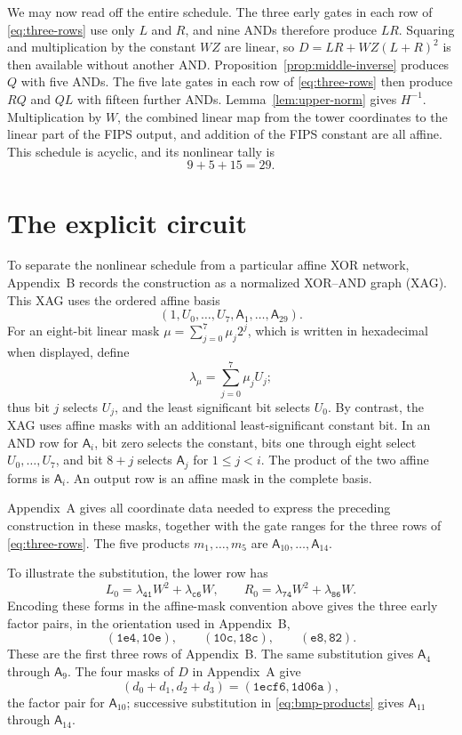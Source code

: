 \documentclass[11pt]{article}
\newcommand{\gate}[1]{\mathsf A_{#1}}
\begin{document}
We may now read off the entire schedule.  The three early gates in each row of
\eqref{eq:three-rows} use only \(L\) and \(R\), and nine ANDs therefore
produce \(LR\).  Squaring and multiplication by the constant \(WZ\) are
linear, so \(D=LR+WZ(L+R)^2\) is then available without another AND.
Proposition~\ref{prop:middle-inverse} produces \(Q\) with five ANDs.  The
five late gates in each row of \eqref{eq:three-rows} then produce \(RQ\)
and \(QL\) with fifteen further ANDs.  Lemma~\ref{lem:upper-norm} gives
\(H^{-1}\).  Multiplication by \(W\), the combined linear map from the tower
coordinates to the linear part of the FIPS output, and addition of the FIPS
constant are all affine.  This schedule is acyclic, and its nonlinear tally is
\[
 9+5+15=29.
\]

\section{The explicit circuit}\label{sec:identification}

To separate the nonlinear schedule from a particular affine XOR network,
Appendix~B records the construction as a normalized XOR--AND graph (XAG).
This XAG uses the
ordered affine basis
\[
 (1,U_0,\ldots,U_7,\gate{1},\ldots,\gate{29}).
\]
For an eight-bit linear mask \(\mu=\sum_{j=0}^7\mu_j2^j\), which is
written in hexadecimal when displayed, define
\[
 \lambda_\mu=\sum_{j=0}^7\mu_jU_j;
\]
thus bit \(j\) selects \(U_j\), and the least significant bit selects
\(U_0\).  By contrast, the XAG uses affine masks with an additional
least-significant constant bit.  In an AND row for \(\gate{i}\), bit zero
selects the constant, bits one through eight select \(U_0,\ldots,U_7\),
and bit \(8+j\) selects \(\gate{j}\) for \(1\leq j<i\).  The product of
the two affine forms is \(\gate{i}\).  An output row is an affine mask in
the complete basis.

Appendix~A gives all coordinate data needed to express the preceding
construction in these masks, together with the gate ranges for the three
rows of \eqref{eq:three-rows}.  The five products
\(m_1,\ldots,m_5\) are \(\gate{10},\ldots,\gate{14}\).

To illustrate the substitution, the lower row has
\[
 L_0=\lambda_{\mathtt{41}}W^2+\lambda_{\mathtt{c6}}W,\qquad
 R_0=\lambda_{\mathtt{74}}W^2+\lambda_{\mathtt{86}}W.
\]
Encoding these forms in the affine-mask convention above gives the three
early factor pairs, in the orientation used in Appendix~B,
\[
 (\mathtt{1e4},\mathtt{10e}),\qquad
 (\mathtt{10c},\mathtt{18c}),\qquad
 (\mathtt{e8},\mathtt{82}).
\]
These are the first three rows of Appendix~B.
The same substitution gives \(\gate{4}\) through \(\gate{9}\).
The four masks of \(D\) in Appendix~A give
\[
 (d_0+d_1,d_2+d_3)=(\mathtt{1ecf6},\mathtt{1d06a}),
\]
the factor pair for \(\gate{10}\); successive substitution in
\eqref{eq:bmp-products} gives \(\gate{11}\) through \(\gate{14}\).
\end{document}
